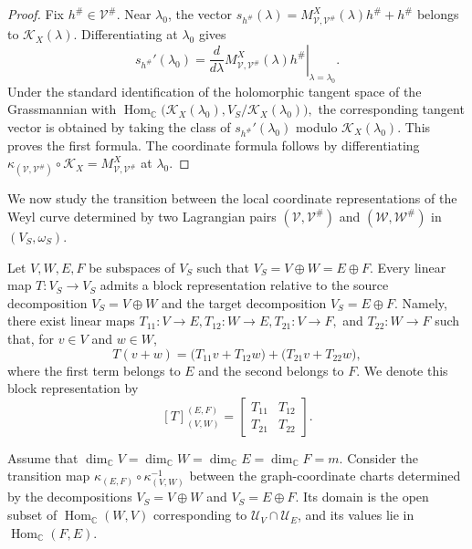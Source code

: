 \documentclass[10pt,a4paper]{amsart}
\numberwithin{equation}{section} \numberwithin{figure}{section}
\renewcommand*{\to}{\rightarrow}
\newcommand{\mb}[1]{\mathbb{#1}} %
\newcommand{\mc}[1]{\mathcal{#1}}
\begin{document}
\begin{proof}
Fix \(h^\#\in\mc V^\#\). Near \(\lambda_0\), the vector
\(
    s_{h^\#}(\lambda)
    =
    M_{\mc V,\mc V^\#}^X(\lambda)h^\#+h^\#
\)
belongs to \(\mc K_X(\lambda)\). Differentiating at \(\lambda_0\)
gives
\[
    s_{h^\#}'(\lambda_0)
    =
    \left.
    \frac{d}{d\lambda}
    M_{\mc V,\mc V^\#}^X(\lambda)h^\#
    \right|_{\lambda=\lambda_0}.
\]
Under the standard identification of the holomorphic tangent space of
the Grassmannian with
\(
    \operatorname{Hom}_{\mb C}
    \bigl(
        \mc K_X(\lambda_0),
        V_S/\mc K_X(\lambda_0)
    \bigr),
\)
the corresponding tangent vector is obtained by taking the class of
\(s_{h^\#}'(\lambda_0)\) modulo \(\mc K_X(\lambda_0)\). This proves
the first formula. The coordinate formula follows by differentiating
\(
    \kappa_{(\mc V,\mc V^\#)}\circ\mc K_X
    =
    M_{\mc V,\mc V^\#}^X
\)
at \(\lambda_0\).
\end{proof}

We now study the transition between the local coordinate
representations of the Weyl curve determined by two Lagrangian pairs
\((\mc V,\mc V^\#)\) and \((\mc W,\mc W^\#)\) in
\((V_S,\omega_S)\).

Let \(V,W,E,F\) be subspaces of \(V_S\) such that
\(
    V_S=V\oplus W=E\oplus F.
\)
Every linear map \(T:V_S\to V_S\) admits a block representation
relative to the source decomposition \(V_S=V\oplus W\) and the target
decomposition \(V_S=E\oplus F\). Namely, there exist linear maps
\(
    T_{11}:V\to E,
    T_{12}:W\to E,
    T_{21}:V\to F,
\)
and \(T_{22}:W\to F\) such that, for \(v\in V\) and \(w\in W\),
\[
    T(v+w)
    =
    \bigl(T_{11}v+T_{12}w\bigr)
    +
    \bigl(T_{21}v+T_{22}w\bigr),
\]
where the first term belongs to \(E\) and the second belongs to \(F\).
We denote this block representation by
\[
    [T]_{(V,W)}^{(E,F)}
    =
    \begin{bmatrix}
        T_{11} & T_{12}\\
        T_{21} & T_{22}
    \end{bmatrix}.
\]

Assume that
\(
    \dim_{\mb C}V
    =
    \dim_{\mb C}W
    =
    \dim_{\mb C}E
    =
    \dim_{\mb C}F
    =
    m.
\)
Consider the transition map
\(
    \kappa_{(E,F)}
    \circ
    \kappa_{(V,W)}^{-1}
\)
between the graph-coordinate charts determined by the decompositions
\(V_S=V\oplus W\) and \(V_S=E\oplus F\).
Its domain is the open subset of
\(\operatorname{Hom}_{\mb C}(W,V)\) corresponding to
\(\mc U_V\cap\mc U_E\), and its values lie in
\(\operatorname{Hom}_{\mb C}(F,E)\).
\end{document}
